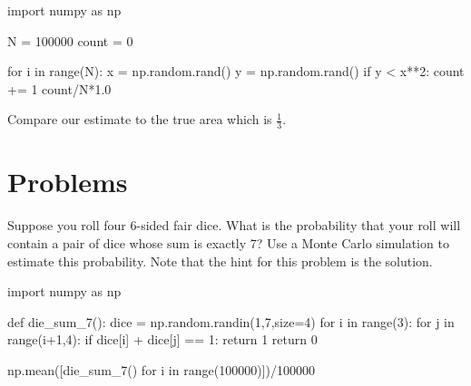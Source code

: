 \documentclass{ximera}
\begin{document}
\begin{sageCell}
import numpy as np

N = 100000
count = 0

for i in range(N):
        x = np.random.rand()
        y = np.random.rand()
        if y < x**2:
                count += 1
count/N*1.0
\end{sageCell}

Compare our estimate to the true area which is $\frac{1}{3}$.

\section{Problems}

\begin{question}
Suppose you roll four 6-sided fair dice. What is the probability that your roll will contain a pair of dice whose sum is exactly 7? Use a Monte Carlo simulation to estimate this probability. Note that the hint for this problem is the solution.

\begin{hint}
	\begin{sageCell}
import numpy as np

def die_sum_7():
        dice = np.random.randin(1,7,size=4)
        for i in range(3):
                for j in range(i+1,4):
                        if dice[i] + dice[j] == 1: 
                               return 1
        return 0

np.mean([die_sum_7() for i in range(100000)])/100000
	\end{sageCell}
\end{hint}
\end{question}
\end{document}
